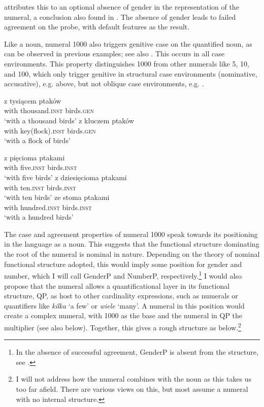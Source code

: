 \documentclass[output=paper]{langscibook}
\begin{document}
\noindent \citet{klockmann2017semiLex} attributes this to an optional absence of gender in the representation of the numeral, a conclusion also found in \citet{i&m2018}. The absence of gender leads to failed agreement on the probe, with default features as the result.

Like a noun, numeral 1000 also triggers genitive case on the quantified noun, as can be observed in previous examples; see also . This occurs in all case environments. This property distinguishes 1000 from other numerals like 5, 10, and 100, which only trigger genitive in structural case environments (nominative, accusative), e.g.  above, but not oblique case environments, e.g. .

\ea \label{klo:ex:non-structuralCase}
\ea 
\gll z tysiącem ptaków\\
with thousand.\textsc{inst} birds.\textsc{gen}\\
\glt `with a thousand birds'
\ex  \gll z kluczem ptaków\\
with key(flock).\textsc{inst} birds.\textsc{gen}\\
\glt `with a flock of birds'
\z \z

\ea \label{klo:ex:5+obl}
\ea \gll z pięcioma ptakami\\
with five.\textsc{inst} birds.\textsc{inst}\\
\glt `with five birds'
\ex  \gll z dziesięcioma ptakami\\
with ten.\textsc{inst} birds.\textsc{inst}\\
\glt `with ten birds'
\ex  \gll ze stoma ptakami\\
with hundred.\textsc{inst} birds.\textsc{inst}\\
\glt `with a hundred birds'
\z \z %

\noindent The case and agreement properties of numeral 1000 speak towards its positioning in the language as a noun. This suggests that the functional structure dominating the root of the numeral is nominal in nature. Depending on the theory of nominal functional structure adopted, this would imply some position for gender and number, which I will call GenderP and NumberP, respectively.\footnote{In the absence of successful agreement, GenderP is absent from the structure, see .} I would also propose that the numeral allows a quantificational layer in its functional structure, QP, as host to other cardinality expressions, such as numerals or quantifiers like \textit{kilka} `a few' or \textit{wiele} `many'. A numeral in this position would create a complex numeral, with 1000 as the base and the numeral in QP the multiplier (see also  below). Together, this gives a rough structure as below.\footnote{I will not address how the numeral combines with the noun as this takes us too far afield. There are various views on this, but most assume a numeral with no internal structure.}
\end{document}

